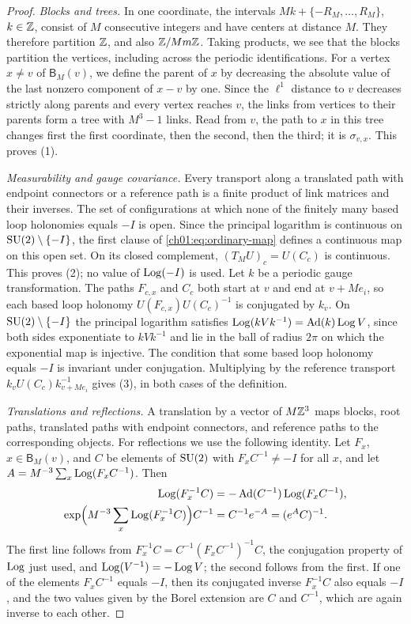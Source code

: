\begin{proof}
\emph{Blocks and trees.} In one coordinate, the intervals $Mk+\{-R_M,\dots,R_M\}$, $k\in\mathbb Z$, consist of $M$ consecutive integers and have centers at distance $M$. They therefore partition $\mathbb Z$, and also $\mathbb Z/Mm\mathbb Z$. Taking products, we see that the blocks partition the vertices, including across the periodic identifications. For a vertex $x\ne v$ of $\mathsf B_M(v)$, we define the parent of $x$ by decreasing the absolute value of the last nonzero component of $x-v$ by one. Since the $\ell^1$ distance to $v$ decreases strictly along parents and every vertex reaches $v$, the links from vertices to their parents form a tree with $M^3-1$ links. Read from $v$, the path to $x$ in this tree changes first the first coordinate, then the second, then the third; it is $\sigma_{v,x}$. This proves (1).

\emph{Measurability and gauge covariance.} Every transport along a translated path with endpoint connectors or a reference path is a finite product of link matrices and their inverses. The set of configurations at which none of the finitely many based loop holonomies equals $-I$ is open. Since the principal logarithm is continuous on $\mathrm{SU}(2)\setminus\{-I\}$, the first clause of \eqref{ch01:eq:ordinary-map} defines a continuous map on this open set. On its closed complement, $(T_MU)_c=U(C_c)$ is continuous. This proves (2); no value of $\operatorname{Log}(-I)$ is used. Let $k$ be a periodic gauge transformation. The paths $F_{c,x}$ and $C_c$ both start at $v$ and end at $v+Me_i$, so each based loop holonomy $U(F_{c,x})U(C_c)^{-1}$ is conjugated by $k_v$. On $\mathrm{SU}(2)\setminus\{-I\}$ the principal logarithm satisfies $\operatorname{Log}(kVk^{-1})=\operatorname{Ad}(k)\operatorname{Log} V$, since both sides exponentiate to $kVk^{-1}$ and lie in the ball of radius $2\pi$ on which the exponential map is injective. The condition that some based loop holonomy equals $-I$ is invariant under conjugation. Multiplying by the reference transport $k_vU(C_c)k_{v+Me_i}^{-1}$ gives (3), in both cases of the definition.

\emph{Translations and reflections.} A translation by a vector of $M\mathbb Z^3$ maps blocks, root paths, translated paths with endpoint connectors, and reference paths to the corresponding objects. For reflections we use the following identity. Let $F_x$, $x\in\mathsf B_M(v)$, and $C$ be elements of $\mathrm{SU}(2)$ with $F_xC^{-1}\ne-I$ for all $x$, and let $A=M^{-3}\sum_x\operatorname{Log}(F_xC^{-1})$. Then
\begin{equation}\label{ch03:eq:reverse-average}
 \begin{split}
 \operatorname{Log}(F_x^{-1}C)&=-\operatorname{Ad}(C^{-1})\operatorname{Log}(F_xC^{-1}),\\
 \exp\Bigl(M^{-3}\sum_x\operatorname{Log}(F_x^{-1}C)\Bigr)C^{-1}&=C^{-1}e^{-A}=(e^AC)^{-1}.
 \end{split}
\end{equation}
The first line follows from $F_x^{-1}C=C^{-1}(F_xC^{-1})^{-1}C$, the conjugation property of $\operatorname{Log}$ just used, and $\operatorname{Log}(V^{-1})=-\operatorname{Log} V$; the second follows from the first. If one of the elements $F_xC^{-1}$ equals $-I$, then its conjugated inverse $F_x^{-1}C$ also equals $-I$, and the two values given by the Borel extension are $C$ and $C^{-1}$, which are again inverse to each other.


\end{proof}
